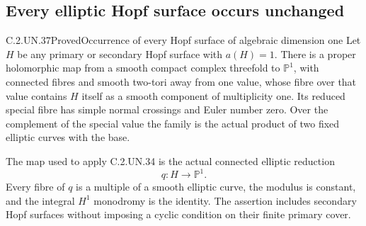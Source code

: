 \subsection{Every elliptic Hopf surface occurs unchanged}

\begin{statement}{C.2.UN.37}{Proved}{Occurrence of every Hopf surface of algebraic dimension one}
Let $H$ be any primary or secondary Hopf surface with $a(H)=1$.
There is a proper holomorphic map from a smooth compact complex
threefold to $\mathbb P^1$, with connected fibres and smooth
two-tori away from one value, whose fibre over that value contains
$H$ itself as a smooth component of multiplicity one. Its reduced
special fibre has simple normal crossings and Euler number zero.
Over the complement of the special value the family is the
actual product of two fixed elliptic curves with the base.

The map used to apply C.2.UN.34 is the actual connected elliptic
reduction
\[
                         q:H\longrightarrow\mathbb P^1.
\tag{C.EH.1}
\]
Every fibre of $q$ is a multiple of a smooth elliptic curve,
the modulus is constant, and the integral $H^1$ monodromy is
the identity. The assertion includes secondary Hopf surfaces
without imposing a cyclic condition on their finite primary cover.
\end{statement}

